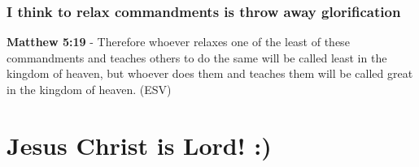\documentclass[11pt]{article}
\begin{document}
\subsubsection{I think to relax commandments is throw away glorification}
\label{sec:orgf0451a2}
\textbf{Matthew 5:19} -  Therefore whoever relaxes one of the least of these commandments and teaches others to do the same will be called least in the kingdom of heaven, but whoever does them and teaches them will be called great in the kingdom of heaven.  (ESV)

\section{Jesus Christ is Lord! :)}
\label{sec:org44f1d04}
\end{document}
